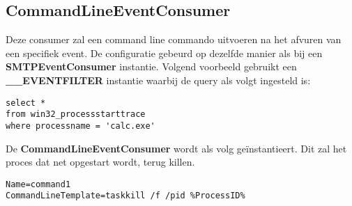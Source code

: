 \documentclass{report}
\begin{document}
	\subsection{CommandLineEventConsumer}
	Deze consumer zal een command line commando uitvoeren na het afvuren van een specifiek event. De configuratie gebeurd op dezelfde manier als bij een \textbf{SMTPEventConsumer} instantie. Volgend voorbeeld gebruikt een \textbf{\_\_EVENTFILTER} instantie waarbij de query als volgt ingesteld is:
	\begin{lstlisting}
select *
from win32_processstarttrace
where processname = 'calc.exe'
	\end{lstlisting}
	De \textbf{CommandLineEventConsumer} wordt als volg geïnstantieert. Dit zal het proces dat net opgestart wordt, terug killen.
	\begin{lstlisting}
Name=command1
CommandLineTemplate=taskkill /f /pid %ProcessID%
	\end{lstlisting}
\end{document}
